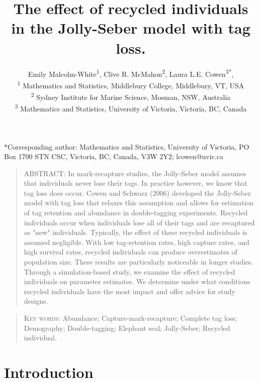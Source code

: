 \documentclass[12pt]{article}
\title{The effect of recycled individuals in the Jolly-Seber model with tag loss.}
\author{Emily Malcolm-White\textsuperscript{1},
        Clive R. McMahon\textsuperscript{2}, 
        Laura L.E. Cowen\textsuperscript{3*}, 
        \\ 
        \textsuperscript{1} Mathematics and Statistics, Middlebury College, Middlebury, VT, USA\\ 
        \textsuperscript{2} Sydney Institute for Marine Science, Mosman, NSW, Australia\\
       \textsuperscript{3} Mathematics and Statistics, University of Victoria, Victoria, BC, Canada}
\date{}
\begin{document}
\maketitle

$*$Corresponding author: Mathematics and Statistics, University of Victoria,
       PO Box 1700 STN CSC, Victoria, BC, Canada, V3W 2Y2; lcowen@uvic.ca
\newpage

\begin{quote}
\textsc{ABSTRACT:} 
In mark-recapture studies, the Jolly-Seber model assumes that individuals never lose their tags. In practice however, we know that tag loss does occur. Cowen and Schwarz (2006) developed the Jolly-Seber model with tag loss that relaxes this assumption and allows for estimation of tag retention and abundance in double-tagging experiments. Recycled individuals occur when individuals lose all of their tags and are recaptured as "new" individuals. Typically, the effect of these recycled individuals is assumed negligible. With low tag-retention rates, high capture rates, and high survival rates, recycled individuals can produce overestimates of population size. These results are particularly noticeable in longer studies. Through a simulation-based study, we examine the effect of recycled individuals on parameter estimates. We determine under what conditions recycled individuals have the most impact and offer advice for study designs. 
\end{quote}

\begin{quote}
\begin{center} \textsc{Key words:} Abundance; Capture-mark-recapture; Complete tag loss;  Demography; Double-tagging; Elephant seal; Jolly-Seber; Recycled individual. 
\end{center}
\end{quote}



\section{Introduction}\label{introduction}
\end{document}
